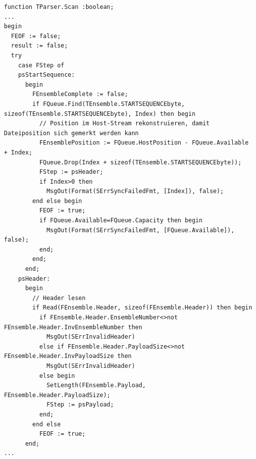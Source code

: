 \begin{lstlisting}[language=Delphi, caption=Exemplary ADCP parser code from Jan Schirrmacher]
function TParser.Scan :boolean;
...
begin
  FEOF := false;
  result := false;
  try
    case FStep of
    psStartSequence:
      begin
        FEnsembleComplete := false;
        if FQueue.Find(TEnsemble.STARTSEQUENCEbyte, sizeof(TEnsemble.STARTSEQUENCEbyte), Index) then begin
          // Position im Host-Stream rekonstruieren, damit Dateiposition sich gemerkt werden kann
          FEnsemblePosition := FQueue.HostPosition - FQueue.Available + Index;
          FQueue.Drop(Index + sizeof(TEnsemble.STARTSEQUENCEbyte));
          FStep := psHeader;
          if Index>0 then
            MsgOut(Format(SErrSyncFailedFmt, [Index]), false);
        end else begin
          FEOF := true;
          if FQueue.Available=FQueue.Capacity then begin
            MsgOut(Format(SErrSyncFailedFmt, [FQueue.Available]), false);
          end;
        end;
      end;
    psHeader:
      begin
        // Header lesen
        if Read(FEnsemble.Header, sizeof(FEnsemble.Header)) then begin
          if FEnsemble.Header.EnsembleNumber<>not FEnsemble.Header.InvEnsembleNumber then
            MsgOut(SErrInvalidHeader)
          else if FEnsemble.Header.PayloadSize<>not FEnsemble.Header.InvPayloadSize then
            MsgOut(SErrInvalidHeader)
          else begin
            SetLength(FEnsemble.Payload, FEnsemble.Header.PayloadSize);
            FStep := psPayload;
          end;
        end else
          FEOF := true;
      end;
...
\end{lstlisting}

